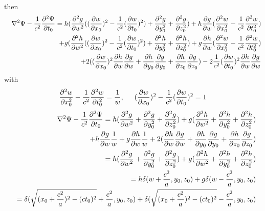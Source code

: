 \documentclass[prd,showpacs,preprint]{revtex4}
\begin{document}
\begin{appendix}
\begin{eqnarray}
\end{eqnarray}
then
\begin{eqnarray}
&&\nabla^2\Psi - \frac{1}{c^2}\frac{\partial^2\Psi}{\partial t_0} = h(\frac{\partial^2 g}{\partial w^2}((\frac{\partial w}{\partial x_0})^2-\frac{1}{c^2}(\frac{\partial w}{\partial t_0})^2)+\frac{\partial^2 g}{\partial y_0^2}+\frac{\partial^2 g}{\partial z_0^2})+h\frac{\partial g}{\partial w}(\frac{\partial^2 w}{\partial x_0^2}-\frac{1}{c^2}\frac{\partial^2 w}{\partial t_0^2})\nonumber\\
&&\hspace{5mm}+g(\frac{\partial^2 h}{\partial w^2}((\frac{\partial w}{\partial x_0})^2-\frac{1}{c^2}(\frac{\partial w}{\partial t_0})^2)+\frac{\partial^2 h}{\partial y_0^2}+\frac{\partial^2 h}{\partial z_0^2})+g\frac{\partial h}{\partial w}(\frac{\partial^2 w}{\partial x_0^2}-\frac{1}{c^2}\frac{\partial^2 w}{\partial t_0^2})\nonumber\\
&&\hspace{5mm}+ 2((\frac{\partial w}{\partial x_0})^2\frac{\partial h}{\partial w}\frac{\partial g}{\partial w}+\frac{\partial h}{\partial y_0}\frac{\partial g}{\partial y_0}+\frac{\partial h}{\partial z_0}\frac{\partial g}{\partial z_0})-2\frac{1}{c^2}(\frac{\partial w}{\partial t_0})^2\frac{\partial h}{\partial w}\frac{\partial g}{\partial w}
\end{eqnarray}
with
\begin{eqnarray}
\frac{\partial^2 w}{\partial x_0^2}-\frac{1}{c^2}\frac{\partial^2 w}{\partial t_0^2}=\frac{1}{w},\hspace{5mm}
(\frac{\partial w}{\partial x_0})^2-\frac{1}{c^2}(\frac{\partial w}{\partial t_0})^2=1
\end{eqnarray}
\begin{eqnarray}
&&\nabla^2\Psi - \frac{1}{c^2}\frac{\partial^2\Psi}{\partial t_0} = h(\frac{\partial^2 g}{\partial w^2}+\frac{\partial^2 g}{\partial y_0^2}+\frac{\partial^2 g}{\partial z_0^2})+g(\frac{\partial^2 h}{\partial w^2}+\frac{\partial^2 h}{\partial y_0^2}+\frac{\partial^2 h}{\partial z_0^2})\nonumber\\
&&\hspace{30mm}+h\frac{\partial g}{\partial w}\frac{1}{w}+g\frac{\partial h}{\partial w}\frac{1}{w} + 2(\frac{\partial h}{\partial w}\frac{\partial g}{\partial w}+\frac{\partial h}{\partial y_0}\frac{\partial g}{\partial y_0}+\frac{\partial h}{\partial z_0}\frac{\partial g}{\partial z_0})\nonumber\\
&&=h(\frac{\partial^2 g}{\partial w^2}+\frac{\partial^2 g}{\partial y_0^2}+\frac{\partial^2 g}{\partial z_0^2})+g(\frac{\partial^2 h}{\partial w^2}+\frac{\partial^2 h}{\partial y_0^2}+\frac{\partial^2 h}{\partial z_0^2})\nonumber\\
&&=h\delta(w+\frac{c^2}{a},y_0,z_0)+g\delta(w-\frac{c^2}{a},y_0,z_0)\\
&&=\delta(\sqrt{(x_0+\frac{c^2}{a})^2-(ct_0)^2}+\frac{c^2}{a},y_0,z_0) + \delta(\sqrt{(x_0+\frac{c^2}{a})^2-(ct_0)^2}-\frac{c^2}{a},y_0,z_0)\nonumber
\end{eqnarray}
\end{appendix}
\end{document}
